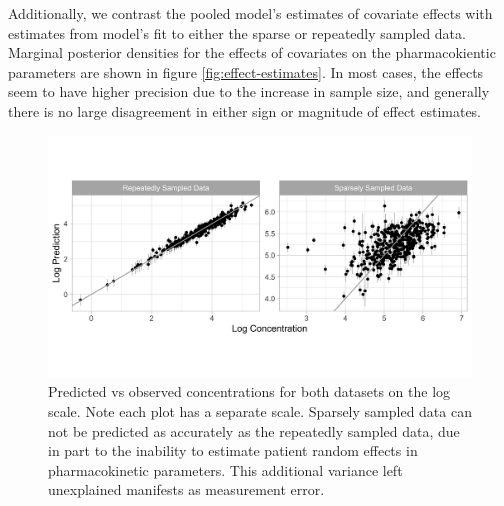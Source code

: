 Additionally, we contrast the pooled model's estimates of covariate
effects with estimates from model's fit to either the sparse or
repeatedly sampled data. Marginal posterior densities for the effects of
covariates on the pharmacokientic parameters are shown in figure
\ref{fig:effect-estimates}. In most cases, the effects seem to have
higher precision due to the increase in sample size, and generally there
is no large disagreement in either sign or magnitude of effect
estimates.



\begin{figure}
	
	{\centering \includegraphics[width=\linewidth]{figures/plot-model-predictions-1} 
		
	}
	
	\caption{Predicted vs observed concentrations for both datasets on the log scale. Note each plot has a separate scale. Sparsely sampled data can not be predicted as accurately as the repeatedly sampled data, due in part to the inability to estimate patient random effects in pharmacokinetic parameters.  This additional variance left unexplained manifests as measurement error.}\label{fig:plot-model-predictions}
\end{figure}

